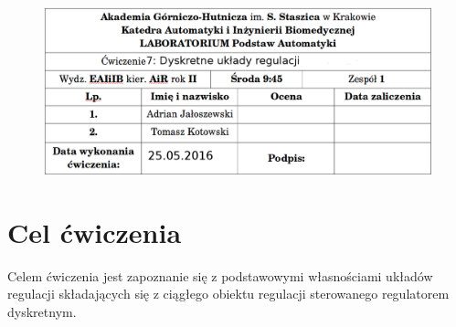 \documentclass[a4paper, 12pt]{article}
\begin{document}
	\begin{figure}[H]
		\centering
		\includegraphics[width = \textwidth]{./img/cudo.png}
	\end{figure}
	\section{Cel ćwiczenia}
		Celem ćwiczenia jest zapoznanie się z podstawowymi własnościami układów regulacji składających się z ciągłego obiektu regulacji sterowanego regulatorem dyskretnym.
\end{document}
